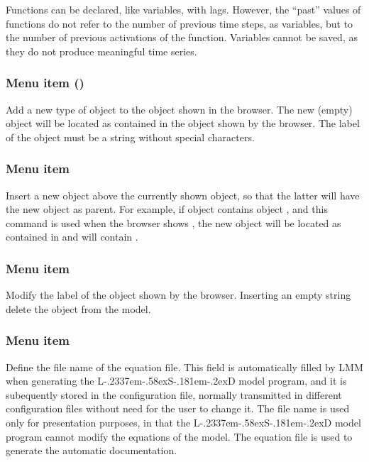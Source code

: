 \documentclass [11pt,a4paper] {book}
\def\LsD{{L\kern-.2337em\lower-.58ex\hbox{S}\kern-.181em\lower-.2ex\hbox{D}}\xspace}
\begin{document}
Functions can be declared, like variables, with lags. However, the ``past'' values of functions do not refer to the number of previous time steps, as variables, but to the number of previous activations of the function. Variables cannot be saved, as they do not produce meaningful time series.

\subsubsection{Menu item  ()}

Add a new type of object to the object shown in the browser. The new (empty) object will be located as contained in the object shown by the browser. The label of the object must be a string without special characters.

\subsubsection{Menu item  }

Insert a new object above the currently shown object, so that the latter will have the new object as parent. For example, if object  contains object , and this command is used when the browser shows , the new object will be located as contained in  and will contain .

\subsubsection{Menu item  }
Modify the label of the object shown by the browser. Inserting an empty string delete the object from the model.

\subsubsection{Menu item  }

Define the file name of the equation file. This field is automatically filled by LMM when generating the \LsD model program, and it is subequently stored in the configuration file, normally transmitted in different configuration files without need for the user to change it. The file name is used only for presentation purposes, in that the \LsD model program cannot modify the equations of the model. The equation file is used to generate the automatic documentation.
\end{document}
